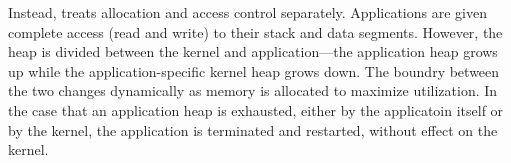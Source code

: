 Instead, \name treats allocation and access control separately. Applications are
given complete access (read and write) to their stack and data segments.
However, the heap is divided between the kernel and application---the
application heap grows up while the application-specific kernel heap grows down.
The boundry between the two changes dynamically as memory is allocated to
maximize utilization. In the case that an application heap is exhausted, either
by the applicatoin itself or by the kernel, the application is terminated and
restarted, without effect on the kernel.

